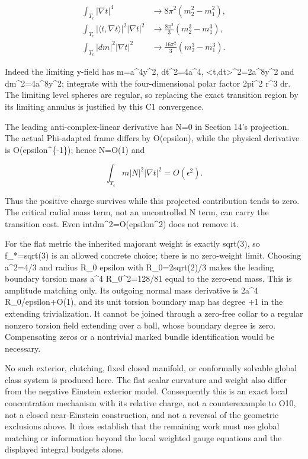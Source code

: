 \documentclass[
  10pt,
]{article}
\begin{document}
\[
\begin{aligned}
 \int_{T_\epsilon}|\nabla t|^4
       &\longrightarrow8\pi^2(m_2^2-m_1^2),\\
 \int_{T_\epsilon}|\langle t,\nabla t\rangle|^2|\nabla t|^2
       &\longrightarrow\frac{8\pi^2}{3}(m_2^3-m_1^3),\\
 \int_{T_\epsilon}|dm|^2|\nabla t|^2
       &\longrightarrow\frac{16\pi^2}{3}(m_2^3-m_1^3).
\end{aligned}                                                   \tag{15.7}
\]

Indeed the limiting y-field has m=a\^{}4\textbar y\textbar\^{}2,
\textbar dt\textbar\^{}2=4a\^{}4,
\textbar\textless t,dt\textgreater\textbar\^{}2=2a\^{}8\textbar y\textbar\^{}2
and \textbar dm\textbar\^{}2=4a\^{}8\textbar y\textbar\^{}2; integrate
with the four-dimensional polar factor 2pi\^{}2 r\^{}3 dr. The limiting
level spheres are regular, so replacing the exact transition region by
its limiting annulus is justified by this C1 convergence.

The leading anti-complex-linear derivative has N=0 in Section 14's
projection. The actual Phi-adapted frame differs by O(epsilon), while
the physical derivative is O(epsilon\^{}\{-1\}); hence N=O(1) and

\[
       \int_{T_\epsilon}m|N|^2|\nabla t|^2=O(\epsilon^2).
                                                               \tag{15.8}
\]

Thus the positive charge survives while this projected contribution
tends to zero. The critical radial mass term, not an uncontrolled N
term, can carry the transition cost. Even
int\textbar dm\textbar\^{}2=O(epsilon\^{}2) does not remove it.

For the flat metric the inherited majorant weight is exactly sqrt(3), so
f\_*=sqrt(3) is an allowed concrete choice; there is no zero-weight
limit. Choosing a\^{}2=4/3 and radius R\_0 epsilon with R\_0=2sqrt(2)/3
makes the leading boundary torsion mass a\^{}4 R\_0\^{}2=128/81 equal to
the zero-end mass. This is amplitude matching only. Its outgoing normal
mass derivative is 2a\^{}4 R\_0/epsilon+O(1), and its unit torsion
boundary map has degree +1 in the extending trivialization. It cannot be
joined through a zero-free collar to a regular nonzero torsion field
extending over a ball, whose boundary degree is zero. Compensating zeros
or a nontrivial marked bundle identification would be necessary.

No such exterior, clutching, fixed closed manifold, or conformally
solvable global class system is produced here. The flat scalar curvature
and weight also differ from the negative Einstein exterior model.
Consequently this is an exact local concentration mechanism with its
relative charge, not a counterexample to O10, not a closed near-Einstein
construction, and not a reversal of the geometric exclusions above. It
does establish that the remaining work must use global matching or
information beyond the local weighted gauge equations and the displayed
integral budgets alone.
\end{document}
